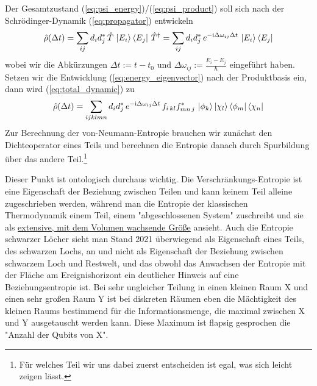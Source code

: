 \documentclass[12pt]{article}
\begin{document}
Der Gesamtzustand (\ref{eq:psi_energy})/(\ref{eq:psi_product}) soll sich nach der Schrödinger-Dynamik (\ref{eq:propagator}) entwickeln
\begin{equation}
\label{eq:total_dynamic}
\hat{\rho}(\Delta t)=\sum_{ij}d_{i}d_{j}^*\, \hat{T}\, \ket{E_i}\bra{E_j}\, {\hat{T}}^\dagger
= \sum_{ij}d_{i}d_{j}^*\, e^{-\mathrm i \Delta\omega_{ij}\Delta t}\, \ket{E_i}\bra{E_j}
\end{equation}
wobei wir die Abkürzungen $\Delta t := t-t_0$ und $\Delta \omega_{ij} := \frac{E_i - E_j}{\hbar}$ eingeführt haben. Setzen wir die Entwicklung (\ref{eq:energy_eigenvector}) nach der Produktbasis ein, dann wird  (\ref{eq:total_dynamic}) zu 
\begin{equation*}
\hat{\rho}(\Delta t) = \sum_{ijklmn}d_{i}d_{j}^*\, e^{-\mathrm i \Delta\omega_{ij}\Delta t}\, 
f_{i\,kl}f_{mn\,j}^*\, \ket{\phi_k}\ket{\chi_l}\bra{\phi_m}\bra{\chi_n}
\end{equation*}
Zur Berechnung der von-Neumann-Entropie brauchen wir zunächst den Dichteoperator eines Teils und berechnen die Entropie danach durch Spurbildung über das andere Teil.\footnote{Für welches Teil wir uns dabei zuerst entscheiden ist egal, was sich leicht zeigen lässt.}

Dieser Punkt ist ontologisch durchaus wichtig. Die Verschränkungs-Entropie ist eine Eigenschaft der Beziehung zwischen Teilen und kann keinem Teil alleine zugeschrieben werden, während man die Entropie der klassischen Thermodynamik einem Teil, einem "abgeschlossenen System" zuschreibt und sie als \href{https://de.wikipedia.org/wiki/Extensive_Gr%C3%B6%C3%9Fe}{extensive, mit dem Volumen wachsende Größe} ansieht. Auch die Entropie schwarzer Löcher sieht man Stand 2021 überwiegend als Eigenschaft eines Teils, des schwarzen Lochs, an und nicht als Eigenschaft der Beziehung zwischen schwarzem Loch und Restwelt, und das obwohl das Anwachsen der Entropie mit der Fläche am Ereignishorizont ein deutlicher Hinweis auf eine Beziehungsentropie ist. Bei sehr ungleicher Teilung in einen kleinen Raum X und einen sehr großen Raum Y ist bei diskreten Räumen eben die Mächtigkeit des kleinen Raums bestimmend für die Informationsmenge, die maximal zwischen X und Y ausgetauscht werden kann. Diese Maximum ist flapsig gesprochen die "Anzahl der Qubits von X".
\end{document}
